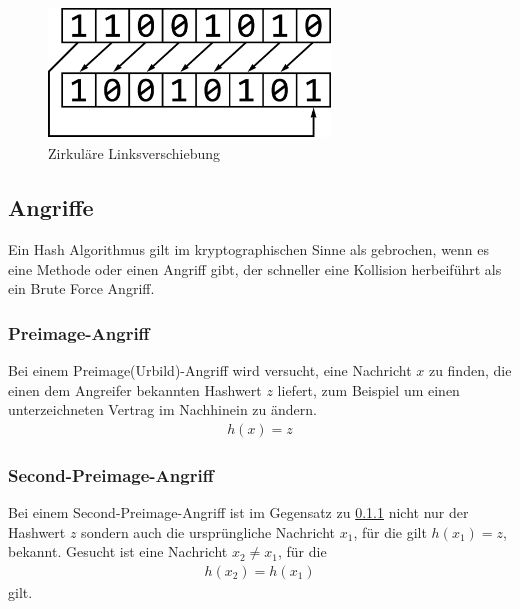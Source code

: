 \documentclass[12pt,a4paper]{scrartcl}
\numberwithin{equation}{section}
\numberwithin{myalgctr}{section}
\numberwithin{mytheoremctr}{section}
\begin{document}
	\begin{figure}[!h]
		\vspace{.25cm}
		\centering
		\includegraphics[width=7.5cm,height=3.56cm]{leftrot}
		\caption{Zirkuläre Linksverschiebung} %
		\label{fig:leftrot}
	\end{figure}

	\subsection{Angriffe}
	Ein Hash Algorithmus gilt im kryptographischen Sinne als gebrochen, wenn es eine Methode oder einen Angriff gibt, der schneller eine Kollision herbeiführt als ein Brute Force Angriff.\autocite[vgl.][2]{schneierSelfStudy}
	
	\subsubsection{Preimage-Angriff}\label{preimage}
	Bei einem Preimage(Urbild)-Angriff wird versucht, eine Nachricht $x$ zu finden, die einen dem Angreifer bekannten Hashwert $z$ liefert, zum Beispiel um einen unterzeichneten Vertrag im Nachhinein zu ändern. \autocite[vgl.][5]{angriffAufMD5uSHA1}
	\begin{align*}
		h(x)=z
	\end{align*}
	\subsubsection{Second-Preimage-Angriff}
	Bei einem Second-Preimage-Angriff ist im Gegensatz zu \cref{preimage} nicht nur der Hashwert $z$ sondern auch die ursprüngliche Nachricht $x_1$, für die gilt $h(x_1) = z$, bekannt. Gesucht ist eine Nachricht $x_2\neq x_1$, für die
	\begin{align*}
		h(x_2)=h(x_1)
	\end{align*}
	gilt. \autocite[vgl.][S. 6 f.]{angriffAufMD5uSHA1}
	
	
\end{document}
